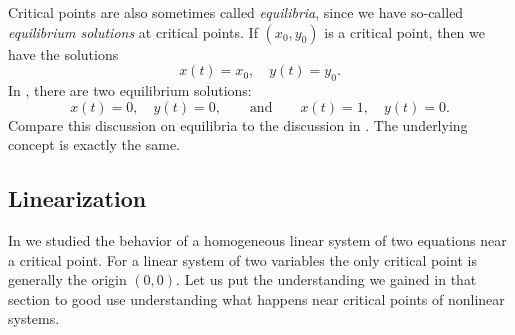 Critical points are also sometimes called
\emph{equilibria}, since we have so-called
\emph{equilibrium solutions} at critical points.
If $(x_0,y_0)$ is a critical point, then we have the solutions
\begin{equation*}
x(t) = x_0, \quad y(t) = y_0 .
\end{equation*}
In , there are two equilibrium
solutions:
\begin{equation*}
x(t) = 0, \quad y(t) = 0,
\qquad \text{and} \qquad
x(t) = 1, \quad y(t) = 0.
\end{equation*}
Compare this discussion on equilibria to the discussion in
.  The underlying concept is
exactly the same.

\subsection{Linearization}

In  we studied the behavior of a homogeneous
linear system of two equations near a critical point.  For a linear system
of two variables the only critical point is generally the origin $(0,0)$.
Let us put the understanding we gained in that section to good use
understanding what happens near critical points of nonlinear systems.

